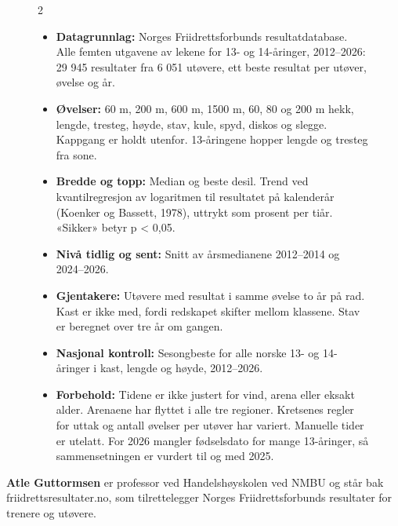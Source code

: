 \begin{figure}[t]
\begin{faktaboks}
\begin{multicols}{2}

\begin{itemize}
\tightlist
\item
  \textbf{Datagrunnlag:} Norges Friidrettsforbunds resultatdatabase. Alle femten utgavene av lekene for 13- og 14-åringer, 2012--2026: 29 945 resultater fra 6 051 utøvere, ett beste resultat per utøver, øvelse og år.
\item
  \textbf{Øvelser:} 60 m, 200 m, 600 m, 1500 m, 60, 80 og 200 m hekk, lengde, tresteg, høyde, stav, kule, spyd, diskos og slegge. Kappgang er holdt utenfor. 13-åringene hopper lengde og tresteg fra sone.
\item
  \textbf{Bredde og topp:} Median og beste desil. Trend ved kvantilregresjon av logaritmen til resultatet på kalenderår (Koenker og Bassett, 1978), uttrykt som prosent per tiår. «Sikker» betyr p \textless{} 0,05.
\item
  \textbf{Nivå tidlig og sent:} Snitt av årsmedianene 2012--2014 og 2024--2026.
\item
  \textbf{Gjentakere:} Utøvere med resultat i samme øvelse to år på rad. Kast er ikke med, fordi redskapet skifter mellom klassene. Stav er beregnet over tre år om gangen.
\item
  \textbf{Nasjonal kontroll:} Sesongbeste for alle norske 13- og 14-åringer i kast, lengde og høyde, 2012--2026.
\item
  \textbf{Forbehold:} Tidene er ikke justert for vind, arena eller eksakt alder. Arenaene har flyttet i alle tre regioner. Kretsenes regler for uttak og antall øvelser per utøver har variert. Manuelle tider er utelatt. For 2026 mangler fødselsdato for mange 13-åringer, så sammensetningen er vurdert til og med 2025.
\end{itemize}

\end{multicols}
\end{faktaboks}
\end{figure}

\begin{forfatterboks}

\textbf{Atle Guttormsen} er professor ved Handelshøyskolen ved NMBU og står bak friidrettsresultater.no, som tilrettelegger Norges Friidrettsforbunds resultater for trenere og utøvere.

\end{forfatterboks}

